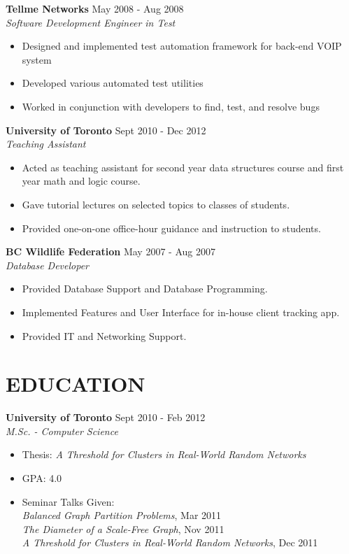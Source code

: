 \documentclass[line,margin]{res}
\begin{document}
\begin{resume}
    {\bf Tellme Networks} \hfill May 2008 - Aug 2008 \\
    {\sl Software Development Engineer in Test}
                 \begin{itemize}  \itemsep -2pt %
                 \item Designed and implemented test automation framework for back-end VOIP system\item Developed various automated test utilities\item Worked in conjunction with developers to find, test, and resolve bugs
                \end{itemize}
  
    {\bf University of Toronto} \hfill Sept 2010 - Dec 2012 \\
    {\sl Teaching Assistant}
                 \begin{itemize}  \itemsep -2pt %
                 \item Acted as teaching assistant for second year data structures course and first year math and logic course.\item Gave tutorial lectures on selected topics to classes of students.\item Provided one-on-one office-hour guidance and instruction to students.
                \end{itemize}
  
    {\bf BC Wildlife Federation} \hfill May 2007 - Aug 2007 \\
    {\sl Database Developer}
                 \begin{itemize}  \itemsep -2pt %
                 \item Provided Database Support and Database Programming.\item Implemented Features and User Interface for in-house client tracking app.\item Provided IT and Networking Support.
                \end{itemize}
  

\section{EDUCATION}

    {\bf University of Toronto} \hfill Sept 2010 - Feb 2012 \\
    {\sl M.Sc. - Computer Science}
                 \begin{itemize}  \itemsep -2pt %
                 \item Thesis: \textit{A Threshold for Clusters in Real-World Random Networks}\item GPA: 4.0 \item Seminar Talks Given:
          \\ \textit{Balanced Graph Partition Problems}, Mar 2011
          \\ \textit{The Diameter of a Scale-Free Graph}, Nov 2011
          \\ \textit{A Threshold for Clusters in Real-World Random Networks}, Dec 2011
                \end{itemize}
  

\end{resume}
\end{document}
